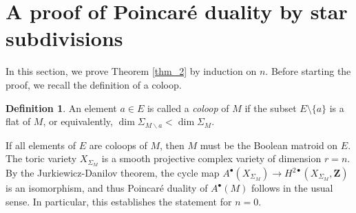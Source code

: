 \documentclass[a4paper,final,oneside]{amsart}
\theoremstyle{definition}
\newtheorem{definition}{Definition}
\theoremstyle{plain}
\theoremstyle{remark}
\begin{document}
\section{A proof of Poincar\'e duality by star subdivisions}\label{sec_1}
In this section, we prove Theorem \ref{thm_2} by induction on \(n\).  Before starting the proof, we recall the definition of a coloop.
\begin{definition}
An element \(a\in E\) is called a \emph{coloop} of \(M\) if the subset \(E\setminus\{a\}\) is a flat of \(M\), or equivalently, \(\dim \Sigma_{M\backslash a}< \dim \Sigma_M\).
\end{definition}
If all elements of \(E\) are coloops of \(M\), then \(M\) must be the Boolean matroid on \(E\).
The toric variety \(X_{\Sigma_M}\) is a smooth projective complex variety of dimension \(r=n\).
By the Jurkiewicz-Danilov theorem, the cycle map \(A^{\bullet}(X_{\Sigma_M})\to H^{2\bullet}(X_{\Sigma_M},\symbf{Z})\) is an isomorphism, and thus Poincar\'e duality of \(A^{\bullet}(M)\) follows in the usual sense.
In particular, this establishes the statement for \(n=0\).
\end{document}
